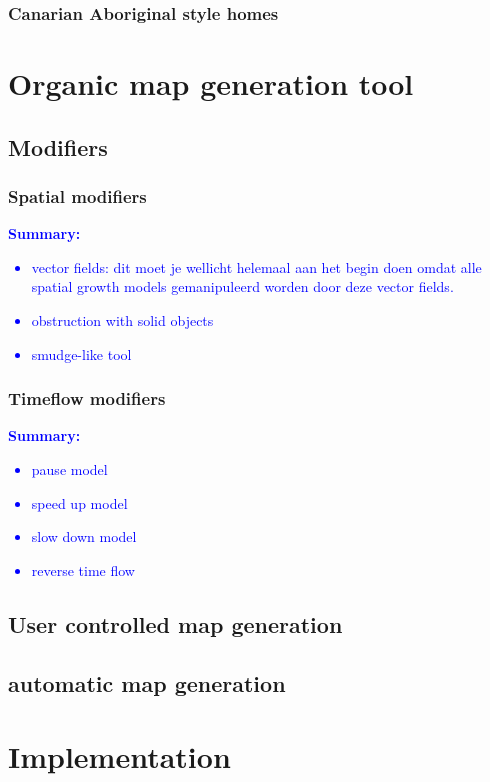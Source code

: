 \documentclass{article}
\newcommand{\inhoud}[1]{\textcolor{blue}{\textbf{\newline Summary: }\it{#1}}}
\begin{document}
\subsubsection{Canarian Aboriginal style homes}

\section{Organic map generation tool}

\subsection{Modifiers}

\subsubsection{Spatial modifiers}

\inhoud{
\begin{itemize}
\item vector fields: dit moet je wellicht helemaal aan het begin doen omdat alle spatial growth models
gemanipuleerd worden door deze vector fields.
\item obstruction with solid objects
\item smudge-like tool
\end{itemize}
}

\subsubsection{Timeflow modifiers}
\inhoud{
\begin{itemize}
\item pause model
\item speed up model
\item slow down model
\item reverse time flow
\end{itemize}
}


\subsection{User controlled map generation}

\subsection{automatic map generation} 


\section{Implementation}
\end{document}
